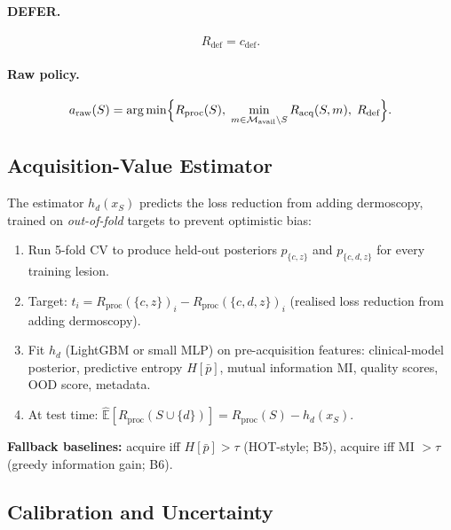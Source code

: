 \documentclass[conference]{IEEEtran}
\DeclareMathOperator*{\argmin}{arg\,min}
\newcommand{\E}{\mathbb{E}}
\newcommand{\1}{\mathbf{1}}
\begin{document}
\paragraph{DEFER.}
\begin{equation}
  R_{\text{def}} = c_{\text{def}}.
  \label{eq:Rdef}
\end{equation}

\paragraph{Raw policy.}
\begin{equation}
  a_{\text{raw}}(S) = \argmin\Bigl\{
    R_{\text{proc}}(S),\;
    \min_{m \in \mathcal{M}_{\text{avail}}\setminus S} R_{\text{acq}}(S,m),\;
    R_{\text{def}}
  \Bigr\}.
  \label{eq:policy_raw}
\end{equation}

\subsection{Acquisition-Value Estimator}

The estimator $h_d(x_S)$ predicts the loss reduction from adding dermoscopy,
trained on \emph{out-of-fold} targets to prevent optimistic bias:

\begin{enumerate}[leftmargin=*, label=\textbf{Step \arabic*.}]
  \item Run 5-fold CV to produce held-out posteriors $p_{\{c,z\}}$ and
        $p_{\{c,d,z\}}$ for every training lesion.
  \item Target: $t_i = R_{\text{proc}}(\{c,z\})_i - R_{\text{proc}}(\{c,d,z\})_i$
        (realised loss reduction from adding dermoscopy).
  \item Fit $h_d$ (LightGBM or small MLP) on pre-acquisition features:
        clinical-model posterior, predictive entropy $H[\bar{p}]$, mutual
        information MI, quality scores, OOD score, metadata.
  \item At test time: $\hat{\E}[R_{\text{proc}}(S\cup\{d\})] = R_{\text{proc}}(S) - h_d(x_S)$.
\end{enumerate}

\noindent\textbf{Fallback baselines:} acquire iff $H[\bar{p}] > \tau$
(HOT-style; B5), acquire iff MI $> \tau$ (greedy information gain; B6).

\subsection{Calibration and Uncertainty}
\end{document}
